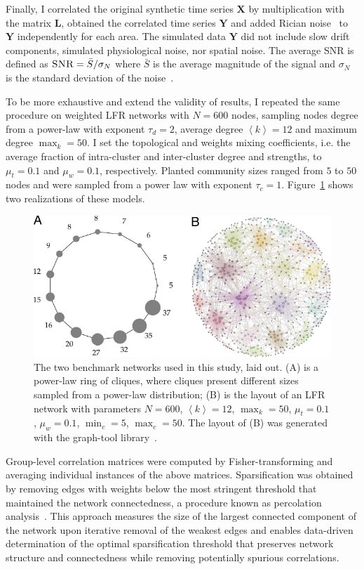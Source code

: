 Finally, I correlated the original synthetic time series $\mathbf{X}$ by multiplication with the matrix $\mathbf{L}$, obtained the correlated time series $\mathbf{Y}$ and added Rician noise~\cite{Gudbjartsson1995} to $\mathbf{Y}$ independently for each area.
The simulated data $\mathbf{Y}$ did not include slow drift components, simulated physiological noise, nor spatial noise.
The average SNR is defined as $\textsc{SNR}=\bar{S}/\sigma_N$ where $\bar{S}$ is the average magnitude of the signal and $\sigma_N$ is the standard deviation of the noise~\cite{kruger2011}.

To be more exhaustive and extend the validity of results, I repeated the same procedure on weighted LFR networks with $N=600$ nodes, sampling nodes degree from a power-law with exponent $\tau_d=2$, average degree $\left<k\right>=12$ and maximum degree $\max_k=50$.
I set the topological and weights mixing coefficients, i.e.
the average fraction of intra-cluster and inter-cluster degree and strengths, to $\mu_t=0.1$ and $\mu_w=0.1$, respectively.
Planted community sizes ranged from $5$ to $50$ nodes and were sampled from a power law with exponent $\tau_c=1$.
Figure~\ref{fig:lfrringclique} shows two realizations of these models.

\begin{figure}[!htb]
\centering
\includegraphics[width=1\textwidth]{images/pacopaperfigure1.pdf}
\caption{The two benchmark networks used in this study, laid out.
(A) is a power-law ring of cliques, where cliques present different sizes sampled from a power-law distribution;
(B) is the layout of an LFR network with parameters $N=600$, $\left< k \right>=12$, $\max_k=50$, $\mu_t=0.1$, $\mu_w=0.1$, $\min_c=5$, $\max_c=50$.
The layout of (B) was generated with the graph-tool library~\cite{peixoto_graph_tool_2014}.}
\label{fig:lfrringclique}
\end{figure}

Group-level correlation matrices were computed by Fisher-transforming and averaging individual instances of the above matrices.
Sparsification was obtained by removing edges with weights below the most stringent threshold that maintained the network connectedness, a procedure known as percolation analysis~\cite{gallos2012,bardella2016a,alexander-bloch2010}.
This approach measures the size of the largest connected component of the network upon iterative removal of the weakest edges and enables data-driven determination of the optimal sparsification threshold that preserves network structure and connectedness while removing potentially spurious correlations.

